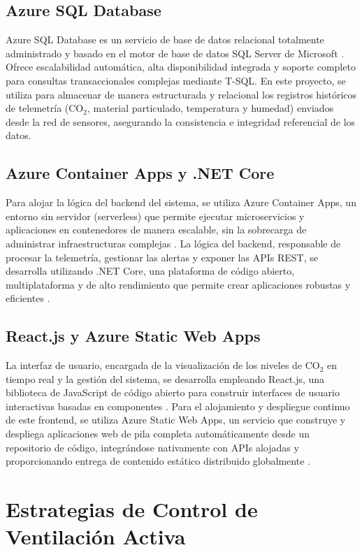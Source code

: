 \subsection{Azure SQL Database}
Azure SQL Database es un servicio de base de datos relacional totalmente administrado y basado en el motor de base de datos SQL Server de Microsoft \cite{azuresql_docs}. Ofrece escalabilidad automática, alta disponibilidad integrada y soporte completo para consultas transaccionales complejas mediante T-SQL. En este proyecto, se utiliza para almacenar de manera estructurada y relacional los registros históricos de telemetría (CO\(_2\), material particulado, temperatura y humedad) enviados desde la red de sensores, asegurando la consistencia e integridad referencial de los datos.

\subsection{Azure Container Apps y .NET Core}
Para alojar la lógica del backend del sistema, se utiliza Azure Container Apps, un entorno sin servidor (serverless) que permite ejecutar microservicios y aplicaciones en contenedores de manera escalable, sin la sobrecarga de administrar infraestructuras complejas \cite{containerapps_docs}. La lógica del backend, responsable de procesar la telemetría, gestionar las alertas y exponer las APIs REST, se desarrolla utilizando .NET Core, una plataforma de código abierto, multiplataforma y de alto rendimiento que permite crear aplicaciones robustas y eficientes \cite{net_core}.

\subsection{React.js y Azure Static Web Apps}
La interfaz de usuario, encargada de la visualización de los niveles de CO\(_2\) en tiempo real y la gestión del sistema, se desarrolla empleando React.js, una biblioteca de JavaScript de código abierto para construir interfaces de usuario interactivas basadas en componentes \cite{reactjs_docs}. Para el alojamiento y despliegue continuo de este frontend, se utiliza Azure Static Web Apps, un servicio que construye y despliega aplicaciones web de pila completa automáticamente desde un repositorio de código, integrándose nativamente con APIs alojadas y proporcionando entrega de contenido estático distribuido globalmente \cite{staticwebapps_docs}.

\section{Estrategias de Control de Ventilación Activa}

